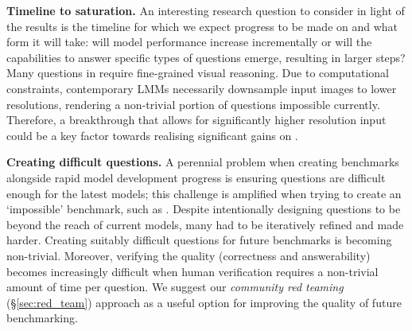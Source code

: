 \textbf{Timeline to saturation.} 
An interesting research question to consider in light of the results is the timeline for which we expect progress to be made on \benchmarkName %
and what form it will take: will model performance increase incrementally or will the capabilities to answer specific types of questions emerge, resulting in larger steps? Many questions in \benchmarkName require fine-grained visual reasoning. Due to computational constraints, contemporary LMMs necessarily downsample input images to lower resolutions, rendering a non-trivial portion of questions impossible currently. Therefore, a breakthrough that allows for significantly higher resolution input could be a key factor towards realising significant gains on \benchmarkName.

\textbf{Creating difficult questions.} 
A perennial problem when creating benchmarks alongside rapid model development progress is ensuring questions are difficult enough for the latest models; this challenge is amplified when trying to create an `impossible' benchmark, such as \benchmarkName. Despite intentionally designing questions to be beyond the reach of current models, many had to be iteratively refined and made harder. Creating suitably difficult questions for future benchmarks is becoming non-trivial. Moreover, verifying the quality (correctness and answerability) becomes increasingly difficult when human verification requires a non-trivial amount of time per question. We suggest our \textit{community red teaming} (\S\ref{sec:red_team}) approach as a useful option for improving the quality of future benchmarking.



